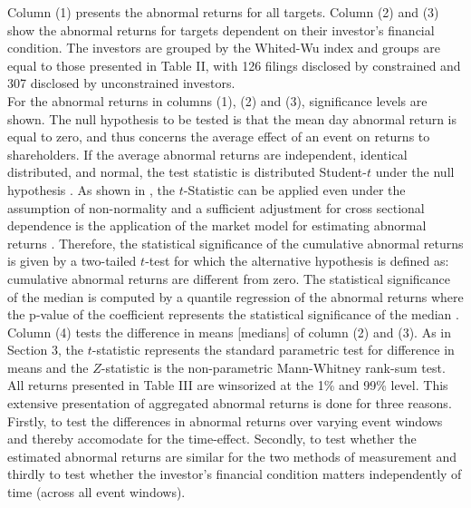 \documentclass[12pt]{article}
\begin{document}
\noindent Column (1) presents the abnormal returns for all targets. Column (2) and (3) show the abnormal returns for targets dependent on their investor's financial condition. The investors are grouped by the Whited-Wu index and groups are equal to those presented in Table II, with 126 filings disclosed by constrained and 307 disclosed by unconstrained investors.\\
For the abnormal returns in columns (1), (2) and (3), significance levels are shown. The null hypothesis to be tested is that the mean day abnormal return is equal to zero, and thus concerns the average effect of an event on returns to shareholders. If the average abnormal returns are independent, identical distributed, and normal, the test statistic is distributed Student-$t$ under the null hypothesis \citep[p.7]{Brown1985}. As shown in \citet[p.11]{Brown1985}, the $t$-Statistic can be applied even under the assumption of non-normality and a sufficient adjustment for cross sectional dependence is the application of the market model for estimating abnormal returns \citep[p.22]{Brown1985}. Therefore, the statistical significance of the cumulative abnormal returns is given by a two-tailed $t$-test for which the alternative hypothesis is defined as: cumulative abnormal returns are different from zero. The statistical significance of the median is computed by a quantile regression of the abnormal returns where the p-value of the coefficient represents the statistical significance of the median \citep{Ucla}. Column (4) tests the difference in means [medians] of column (2) and (3). As in Section 3, the $t$-statistic represents the standard parametric test for difference in means and the $Z$-statistic is the non-parametric Mann-Whitney rank-sum test.
All returns  presented in Table III are winsorized at the 1\% and 99\% level. This extensive presentation of aggregated abnormal returns is done for three reasons. Firstly, to test the differences in abnormal returns over varying event windows and thereby accomodate for the time-effect. Secondly, to test whether the estimated abnormal returns are similar for the two methods of measurement and thirdly to test whether the investor's financial condition matters independently of time (across all event windows).
\end{document}
